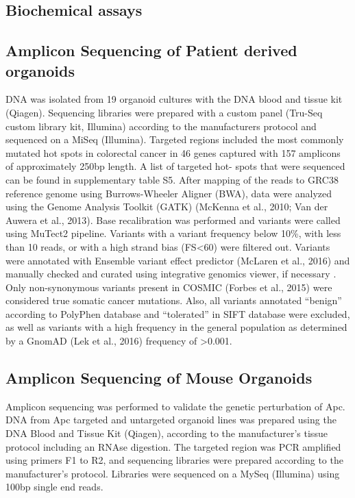 \begin{flushleft}
\section{Biochemical assays}


\subsection{Amplicon Sequencing of Patient derived organoids}
DNA was isolated from 19 organoid cultures with the DNA blood and tissue kit (Qiagen). Sequencing libraries were prepared with a custom panel (Tru-Seq custom library kit, Illumina) according to the manufacturers protocol and sequenced on a MiSeq (Illumina). Targeted regions included the most commonly mutated hot spots in colorectal cancer in 46 genes captured with 157 amplicons of approximately 250bp length. A list of targeted hot- spots that were sequenced can be found in supplementary table S5. After mapping of the reads to GRC38 reference genome using Burrows-Wheeler Aligner (BWA), data were analyzed using the Genome Analysis Toolkit (GATK) (McKenna et al., 2010; Van der Auwera et al., 2013). Base recalibration was performed and variants were called using MuTect2 pipeline. Variants with a variant frequency below 10\%, with less than 10 reads, or with a high strand bias (FS<60) were filtered out. Variants were annotated with Ensemble variant effect predictor (McLaren et al., 2016) and manually checked and curated using integrative genomics viewer, if necessary \cite{Thorvaldsdottir}. Only non-synonymous variants present in COSMIC (Forbes et al., 2015) were considered true somatic cancer mutations.
Also, all variants annotated “benign” according to PolyPhen database and “tolerated” in SIFT database were excluded, as well as variants with a high frequency in the general population as determined by a GnomAD (Lek et al., 2016) frequency of >0.001.

\subsection{Amplicon Sequencing of Mouse Organoids}
Amplicon sequencing was performed to validate the genetic perturbation of Apc. DNA from Apc targeted and untargeted organoid lines was prepared using the DNA Blood and Tissue Kit (Qiagen), according to the manufacturer’s tissue protocol including an RNAse digestion. The targeted region was PCR amplified using primers F1 to R2, and sequencing libraries were prepared according to the manufacturer’s protocol. Libraries were sequenced on a MySeq (Illumina) using 100bp single end reads. 


\end{flushleft}
